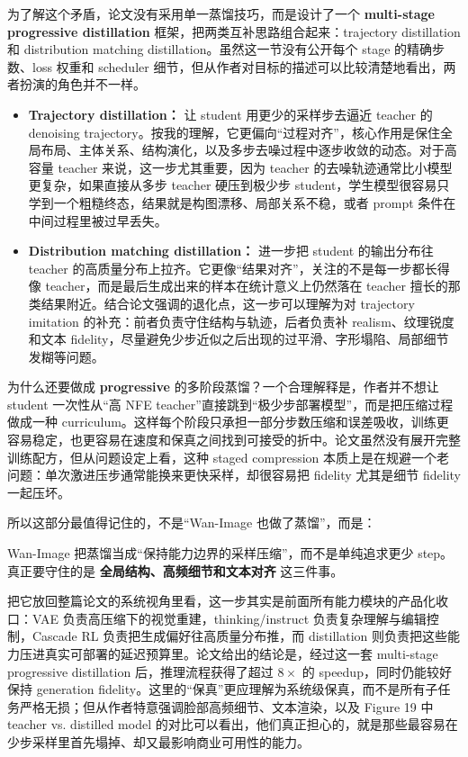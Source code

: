 为了解这个矛盾，论文没有采用单一蒸馏技巧，而是设计了一个 \textbf{multi-stage progressive distillation} 框架，把两类互补思路组合起来：trajectory distillation 和 distribution matching distillation。虽然这一节没有公开每个 stage 的精确步数、loss 权重和 scheduler 细节，但从作者对目标的描述可以比较清楚地看出，两者扮演的角色并不一样。

\begin{itemize}[leftmargin=1.5em]
  \item \textbf{Trajectory distillation：} 让 student 用更少的采样步去逼近 teacher 的 denoising trajectory。按我的理解，它更偏向“过程对齐”，核心作用是保住全局布局、主体关系、结构演化，以及多步去噪过程中逐步收敛的动态。对于高容量 teacher 来说，这一步尤其重要，因为 teacher 的去噪轨迹通常比小模型更复杂，如果直接从多步 teacher 硬压到极少步 student，学生模型很容易只学到一个粗糙终态，结果就是构图漂移、局部关系不稳，或者 prompt 条件在中间过程里被过早丢失。
  \item \textbf{Distribution matching distillation：} 进一步把 student 的输出分布往 teacher 的高质量分布上拉齐。它更像“结果对齐”，关注的不是每一步都长得像 teacher，而是最后生成出来的样本在统计意义上仍然落在 teacher 擅长的那类结果附近。结合论文强调的退化点，这一步可以理解为对 trajectory imitation 的补充：前者负责守住结构与轨迹，后者负责补 realism、纹理锐度和文本 fidelity，尽量避免少步近似之后出现的过平滑、字形塌陷、局部细节发糊等问题。
\end{itemize}

为什么还要做成 \textbf{progressive} 的多阶段蒸馏？一个合理解释是，作者并不想让 student 一次性从“高 NFE teacher”直接跳到“极少步部署模型”，而是把压缩过程做成一种 curriculum。这样每个阶段只承担一部分步数压缩和误差吸收，训练更容易稳定，也更容易在速度和保真之间找到可接受的折中。论文虽然没有展开完整训练配方，但从问题设定上看，这种 staged compression 本质上是在规避一个老问题：单次激进压步通常能换来更快采样，却很容易把 fidelity 尤其是细节 fidelity 一起压坏。

所以这部分最值得记住的，不是“Wan-Image 也做了蒸馏”，而是：

\begin{intubox}
Wan-Image 把蒸馏当成“保持能力边界的采样压缩”，而不是单纯追求更少 step。真正要守住的是 \textbf{全局结构、高频细节和文本对齐} 这三件事。
\end{intubox}

把它放回整篇论文的系统视角里看，这一步其实是前面所有能力模块的产品化收口：VAE 负责高压缩下的视觉重建，thinking/instruct 负责复杂理解与编辑控制，Cascade RL 负责把生成偏好往高质量分布推，而 distillation 则负责把这些能力压进真实可部署的延迟预算里。论文给出的结论是，经过这一套 multi-stage progressive distillation 后，推理流程获得了超过 \(8\times\) 的 speedup，同时仍能较好保持 generation fidelity。这里的“保真”更应理解为系统级保真，而不是所有子任务严格无损；但从作者特意强调脸部高频细节、文本渲染，以及 Figure 19 中 teacher vs. distilled model 的对比可以看出，他们真正担心的，就是那些最容易在少步采样里首先塌掉、却又最影响商业可用性的能力。

